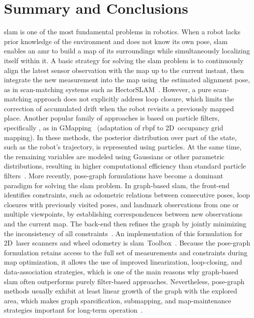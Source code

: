 \section{Summary and Conclusions}\label{sec:literature:conclusions}

\gls{slam} is one of the most fundamental problems in robotics.
When a robot lacks prior knowledge of the environment and
does not know its own pose, \gls{slam} enables an \gls{amr} to build
a map of its surroundings while simultaneously localizing itself within it.
A basic strategy for solving the \gls{slam} problem is to continuously
align the latest sensor observation with the map up to the current instant, then
integrate the new measurement into the map using the estimated alignment pose,
as in scan-matching systems such as HectorSLAM~\cite{kohlbrecher:ssr:2011}.
However, a pure scan-matching approach does not explicitly address loop closure,
which limits the correction of accumulated drift when
the robot revisits a previously mapped place.
Another popular family of approaches is based on particle filters,
specifically ,
as in GMapping~\cite{grisetti:tro:2007}
(adaptation of \gls{rbpf} to 2D~occupancy grid mapping).
In these methods, the posterior distribution over part of the state,
such as the robot's trajectory, is represented using particles.
At the same time, the remaining variables are modeled using Gaussians
or other parametric distributions, resulting in higher computational efficiency
than standard particle filters~\cite{thrun:book:2005}.
More recently, pose-graph formulations have become a dominant paradigm
for solving the \gls{slam} problem. In graph-based \gls{slam},
the front-end identifies constraints, such as odometric relations
between consecutive poses, loop closures with previously visited poses, and
landmark observations from one or multiple viewpoints,
by establishing correspondences between new observations and the current map.
The back-end then refines the graph by jointly minimizing
the inconsistency of all constraints~\cite{bresson:tiv:2017}.
An implementation of this formulation for 2D~laser scanners and wheel odometry
is \gls{slam}~Toolbox~\cite{macenski-jambrecic:joss:2021}.
Because the pose-graph formulation retains access to
the full set of measurements and constraints during map optimization,
it allows the use of improved linearization, loop-closing, and
data-association strategies, which is one of the main reasons
why graph-based \gls{slam} often outperforms purely filter-based approaches.
Nevertheless, pose-graph methods usually exhibit at least linear growth of
the graph with the explored area, which makes graph sparsification,
submapping, and map-maintenance strategies important
for long-term operation~\cite{thrun:book:2005,sousa:jfr:2023}.


